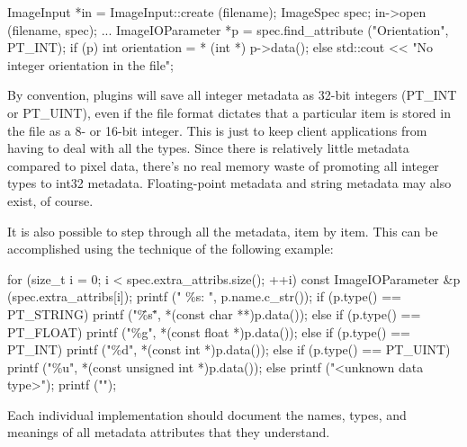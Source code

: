 \begin{code}
        ImageInput *in = ImageInput::create (filename);
        ImageSpec spec;
        in->open (filename, spec);
        ...
        ImageIOParameter *p = spec.find_attribute ("Orientation", PT_INT);
        if (p) {
            int orientation = * (int *) p->data();
        } else {
            std::cout << "No integer orientation in the file\n";
        }
\end{code}

By convention, \ImageInput plugins will save all integer metadata as
32-bit integers ({\cf PT_INT} or {\cf PT_UINT}), even if the file format
dictates that a particular item is stored in the file as a 8- or 16-bit
integer.  This is just to keep client applications from having to deal
with all the types.  Since there is relatively little metadata compared
to pixel data, there's no real memory waste of promoting all integer
types to int32 metadata.  Floating-point metadata and string metadata
may also exist, of course.

It is also possible to step through all the metadata, item by item.
This can be accomplished using the technique of the following example:

\begin{code}
        for (size_t i = 0;  i < spec.extra_attribs.size();  ++i) {
            const ImageIOParameter &p (spec.extra_attribs[i]);
            printf ("    \%s: ", p.name.c_str());
            if (p.type() == PT_STRING)
                printf ("\"\%s\"", *(const char **)p.data());
            else if (p.type() == PT_FLOAT)
                printf ("\%g", *(const float *)p.data());
            else if (p.type() == PT_INT)
                printf ("\%d", *(const int *)p.data());
            else if (p.type() == PT_UINT)
                printf ("\%u", *(const unsigned int *)p.data());
            else
                printf ("<unknown data type>");
            printf ("\n");
        }
\end{code}

Each individual \ImageInput implementation should document the names,
types, and meanings of all metadata attributes that they understand.


%


%



